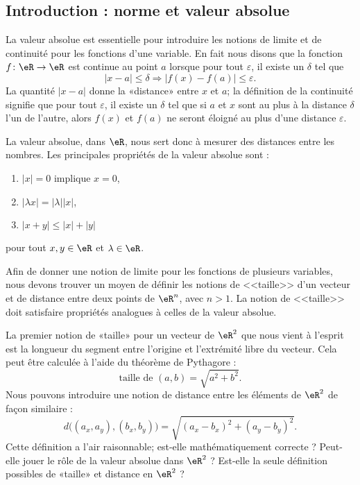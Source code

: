 \subsection{Introduction : norme et valeur absolue}

La valeur absolue est essentielle pour introduire les notions de limite et de continuité pour les fonctions d'une variable. En fait nous disons que la fonction $f\colon \eR\to \eR$ est continue au point $a$ lorsque pour tout $\varepsilon$, il existe un $\delta$ tel que
\begin{equation}
	| x-a |\leq\delta \Rightarrow | f(x)-f(a) |\leq \varepsilon.
\end{equation}
La quantité $| x-a |$ donne la «distance» entre $x$ et $a$; la définition de la continuité signifie que pour tout $\varepsilon$, il existe un $\delta$ tel que si $a$ et $x$ sont au plus à la distance $\delta$ l'un de l'autre, alors $f(x)$ et $f(a)$ ne seront éloigné au plus d'une distance $\varepsilon$.

La valeur absolue, dans $\eR$, nous sert donc à mesurer des distances entre les nombres. Les principales propriétés de la valeur absolue sont :
\begin{enumerate}

	\item
		$| x |=0$ implique $x=0$,
	\item
		$| \lambda x |=| \lambda | |x |$,
	\item
		$| x+y |\leq | x |+| y |$

\end{enumerate}
pour tout $x,y\in\eR$ et $\lambda\in\eR$.

Afin de donner une notion de limite pour les fonctions de plusieurs variables, nous devons trouver un moyen de définir les notions de <<taille>> d'un vecteur et de distance entre deux points de $\eR^n$, avec $n>1$. La notion de <<taille>> doit satisfaire propriétés analogues à celles de la valeur absolue.

La premier notion de «taille» pour un vecteur de $\eR^2$ que nous vient à l'esprit est la longueur du segment entre l'origine et l'extrémité libre du vecteur. Cela peut être calculée à l'aide du théorème de Pythagore :
\begin{equation}
  \textrm{taille de } (a,b) = \sqrt{a^2+b^2}.
\end{equation}
Nous pouvons introduire une notion de distance entre les éléments de $\eR^2$ de façon similaire :
\begin{equation}
	d\big((a_x,a_y),(b_x,b_y)\big)=\sqrt{  (a_x-b_x)^2+(a_y-b_y)^2  }.
\end{equation}
Cette définition a l'air raisonnable; est-elle mathématiquement correcte ? Peut-elle jouer le rôle de la valeur absolue dans $\eR^2$ ? Est-elle la seule définition possibles de «taille» et distance en $\eR^2$ ?

